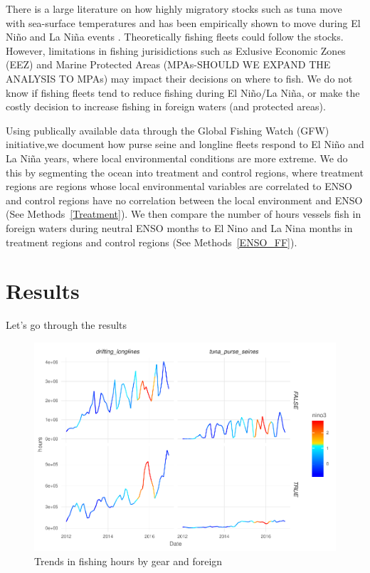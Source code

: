 \documentclass[11pt]{article}
\begin{document}
There is a large literature on how highly migratory stocks such as tuna move with sea-surface temperatures \cite{aqorau:2018} and has been empirically shown to move during El Ni\~{n}o and La Ni\~{n}a events \cite{lehodey:1997}. Theoretically fishing fleets could follow the stocks. However, limitations in fishing jurisidictions such as Exlusive Economic Zones (EEZ) and Marine Protected Areas (MPAs-SHOULD WE EXPAND THE ANALYSIS TO MPAs) may impact their decisions on where to fish. We do not know if fishing fleets tend to reduce fishing during El Ni\~{n}o/La Ni\~{n}a, or make the costly decision to increase fishing in foreign waters (and protected areas). 

Using publically available data through the Global Fishing Watch (GFW) initiative,we document how purse seine and longline fleets respond to El Ni\~{n}o and La Ni\~{n}a years, where local environmental conditions are more extreme. We do this by segmenting the ocean into treatment and control regions, where treatment regions are regions whose local environmental variables are correlated to ENSO and control regions have no correlation between the local environment and ENSO (See Methods~\ref{Treatment}). We then compare the number of hours vessels fish in foreign waters during neutral ENSO months to El Nino and La Nina months in treatment regions and control regions (See Methods~\ref{ENSO_FF}).  

\clearpage

\section{Results}
Let's go through the results

\begin{figure}
\centering
\includegraphics{img/unnamed-chunk-7-1.pdf}
\caption{Trends in fishing hours by gear and foreign}
\end{figure}
\end{document}
